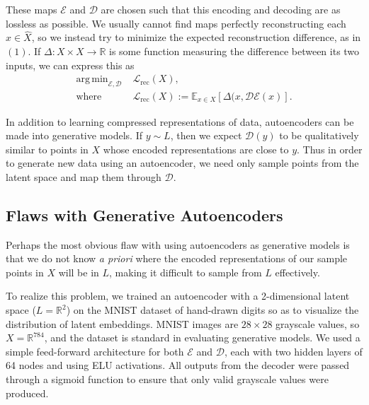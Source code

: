\documentclass[conference]{IEEEtran}
\newcommand{\R}{\mathbb{R}}
\DeclareMathOperator*{\argmin}{arg\,min}
\begin{document}
These maps $\mathcal{E}$ and $\mathcal{D}$ are chosen such that this encoding and decoding are as lossless as possible. We usually cannot find maps perfectly reconstructing each $x \in \hat{X}$, so we instead try to minimize the expected reconstruction difference, as in $(1)$. If $\Delta:X\times X\to \R$ is some function measuring the difference between its two inputs, we can express this as
\begin{align*}
	\argmin_{\mathcal{E}, \mathcal{D}} \; &\mathcal{L}_{\text{rec}}(X), \\
	\text{where } &\mathcal{L}_{\text{rec}}(X) := \mathbb{E}_{x \in X}\left[ \Delta(x, \mathcal{D}\mathcal{E}(x) \right].
\end{align*}

In addition to learning compressed representations of data, autoencoders can be made into generative models. If $y \sim L$, then we expect $\mathcal{D}(y)$ to be qualitatively similar to points in $X$ whose encoded representations are close to $y$. Thus in order to generate new data using an autoencoder, we need only sample points from the latent space and map them through $\mathcal{D}$.


\subsection{Flaws with Generative Autoencoders}
\label{ae-flaws}

Perhaps the most obvious flaw with using autoencoders as generative models is that we do not know \textit{a priori} where the encoded representations of our sample points in $X$ will be in $L$, making it difficult to sample from $L$ effectively.

To realize this problem, we trained an autoencoder with a 2-dimensional latent space ($L=\R^{2}$) on the MNIST dataset of hand-drawn digits so as to visualize the distribution of latent embeddings. MNIST images are $28 \times 28$ grayscale values, so $X = \R^{784}$, and the dataset is standard in evaluating generative models. We used a simple feed-forward architecture for both $\mathcal{E}$ and $\mathcal{D}$, each with two hidden layers of 64 nodes and using ELU activations. All outputs from the decoder were passed through a sigmoid function to ensure that only valid grayscale values were produced.
\end{document}
